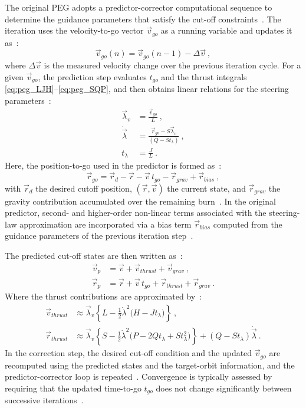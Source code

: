 The original PEG adopts a predictor-corrector computational sequence to determine the guidance parameters that satisfy the cut-off constraints~\cite{SONG2015463}. The iteration uses the velocity-to-go vector $\vec v_{go}$ as a running variable and updates it as~\cite{SONG2015463}:
\begin{equation}
\vec v_{go}(n)=\vec v_{go}(n-1)-\Delta\vec v \ ,
\label{eq:peg_vgo_update}
\end{equation}
where $\Delta\vec v$ is the measured velocity change over the previous iteration cycle. For a given $\vec v_{go}$, the prediction step evaluates $t_{go}$ and the thrust integrals \eqref{eq:peg_LJH}--\eqref{eq:peg_SQP}, and then obtains linear relations for the steering parameters~\cite{SONG2015463}:
\begin{align}
\vec\lambda_v &= \frac{\vec v_{go}}{L} \ ,
\label{eq:peg_lambdav}
\\
\dot{\vec\lambda} &= \frac{\vec r_{go}-S\vec\lambda_v}{(Q-St_\lambda)} \ ,
\label{eq:peg_lambdadot}
\\
t_\lambda &= \frac{J}{L} \ .
\label{eq:peg_tlambda}
\end{align}
Here, the position-to-go used in the predictor is formed as~\cite{SONG2015463}:
\begin{equation}
\vec r_{go}=\vec r_d-\vec r-\vec v\,t_{go}-\vec r_{grav}+\vec r_{bias} \ ,
\label{eq:peg_rgo}
\end{equation}
with $\vec r_d$ the desired cutoff position, $(\vec r,\vec v)$ the current state, and $\vec r_{grav}$ the gravity contribution accumulated over the remaining burn~\cite{SONG2015463}. In the original predictor, second- and higher-order non-linear terms associated with the steering-law approximation are incorporated via a bias term $\vec r_{bias}$ computed from the guidance parameters of the previous iteration step~\cite{SONG2015463}.

The predicted cut-off states are then written as~\cite{SONG2015463}:
\begin{align}
\vec v_p &= \vec v+\vec v_{thrust}+\vec v_{grav} \ ,
\label{eq:peg_vpred}
\\
\vec r_p &= \vec r+\vec v\,t_{go}+\vec r_{thrust}+\vec r_{grav} \ .
\label{eq:peg_rpred}
\end{align}
Where the thrust contributions are approximated by~\cite{SONG2015463}:
\begin{align}
\vec v_{thrust} &\approx \vec\lambda_v\left\{L-\frac{1}{2}\dot{\lambda}^{2}\bigl(H-Jt_\lambda\bigr)\right\} \ ,
\label{eq:peg_vthrust}
\\
\vec r_{thrust} &\approx
\vec\lambda_v\left\{S-\frac{1}{2}\dot{\lambda}^{2}\bigl(P-2Qt_\lambda+St_\lambda^{2}\bigr)\right\}
+(Q-St_\lambda)\dot{\vec\lambda} \ .
\label{eq:peg_rthrust}
\end{align}
In the correction step, the desired cut-off condition and the updated $\vec v_{go}$ are recomputed using the predicted states and the target-orbit information, and the predictor-corrector loop is repeated~\cite{SONG2015463}. Convergence is typically assessed by requiring that the updated time-to-go $t_{go}$ does not change significantly between successive iterations~\cite{SONG2015463}.

